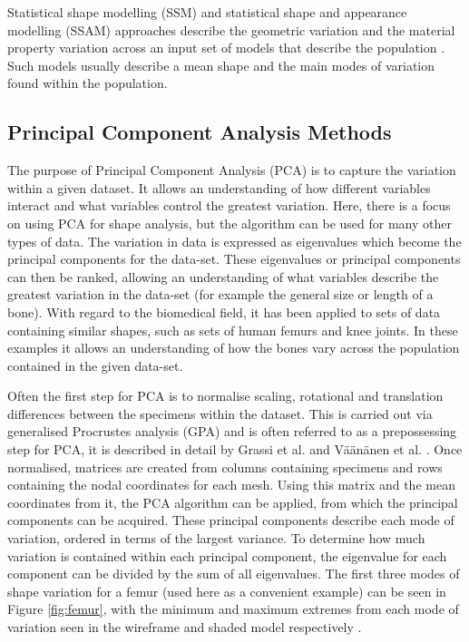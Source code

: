 Statistical shape modelling (SSM) and statistical shape and appearance modelling (SSAM) approaches describe the geometric variation and the material property variation across an input set of models that describe the population \cite{clogenson2015statistical}. Such models usually describe a mean shape and the main modes of variation found within the population.

\subsection{Principal Component Analysis Methods}\label{pca-methods}


The purpose of Principal Component Analysis (PCA) is to capture the variation within a given dataset.
It allows an understanding of how different variables interact and what variables control the greatest variation.
Here, there is a focus on using PCA for shape analysis, but the algorithm can be used for many other types of data.
The variation in data is expressed as eigenvalues which become the principal components for the data-set.
These eigenvalues or principal components can then be ranked, allowing an understanding of what variables describe the greatest variation in the data-set (for example the general size or length of a bone).
With regard to the biomedical field, it has been applied to sets of data containing similar shapes, such as sets of human femurs and knee joints.
In these examples it allows an understanding of how the bones vary across the population contained in the given data-set.


Often the first step for PCA is to normalise scaling, rotational and
translation differences between the specimens within the dataset. This
is carried out via generalised Procrustes analysis (GPA) and is often
referred to as a prepossessing step for PCA, it is described in detail
by Grassi et al. \cite{Grassi2014} and V{\"a}{\"a}n{\"a}nen et al. \cite{Vaananen2015}.
Once normalised, matrices are created from columns containing specimens and rows
containing the nodal coordinates for each mesh. Using this matrix and
the mean coordinates from it, the PCA algorithm can be applied, from
which the principal components can be acquired. These principal
components describe each mode of variation, ordered in terms of the
largest variance. To determine how much variation is contained within
each principal component, the eigenvalue for each component can be
divided by the sum of all eigenvalues. The first three modes of shape
variation for a femur (used here as a convenient example) can be seen in Figure \ref{fig:femur}, with the
minimum and
maximum extremes from each mode of variation seen in the wireframe and
shaded model respectively \cite{Grassi2014}.

